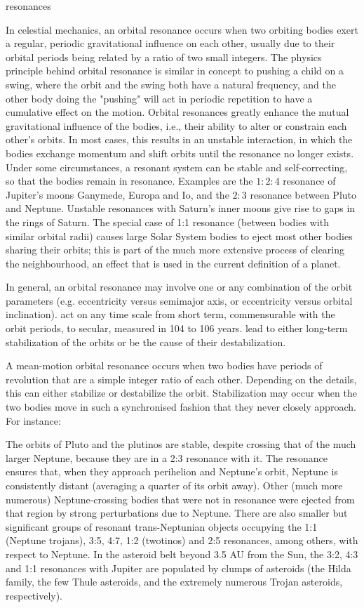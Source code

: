 \begin{frame}[allowframebreaks]{resonances}

In celestial mechanics, an orbital resonance occurs when two orbiting bodies exert a regular, periodic gravitational influence on each other, usually due to their orbital periods being related by a ratio of two small integers. The physics principle behind orbital resonance is similar in concept to pushing a child on a swing, where the orbit and the swing both have a natural frequency, and the other body doing the "pushing" will act in periodic repetition to have a cumulative effect on the motion. Orbital resonances greatly enhance the mutual gravitational influence of the bodies, i.e., their ability to alter or constrain each other's orbits. In most cases, this results in an unstable interaction, in which the bodies exchange momentum and shift orbits until the resonance no longer exists. Under some circumstances, a resonant system can be stable and self-correcting, so that the bodies remain in resonance. Examples are the $1:2:4$ resonance of Jupiter's moons Ganymede, Europa and Io, and the $2:3$ resonance between Pluto and Neptune. Unstable resonances with Saturn's inner moons give rise to gaps in the rings of Saturn. The special case of 1:1 resonance (between bodies with similar orbital radii) causes large Solar System bodies to eject most other bodies sharing their orbits; this is part of the much more extensive process of clearing the neighbourhood, an effect that is used in the current definition of a planet.

In general, an orbital resonance may involve one or any combination of the orbit parameters (e.g. eccentricity versus semimajor axis, or eccentricity versus orbital inclination).
    act on any time scale from short term, commensurable with the orbit periods, to secular, measured in 104 to 106 years.
    lead to either long-term stabilization of the orbits or be the cause of their destabilization.

A mean-motion orbital resonance occurs when two bodies have periods of revolution that are a simple integer ratio of each other. Depending on the details, this can either stabilize or destabilize the orbit. Stabilization may occur when the two bodies move in such a synchronised fashion that they never closely approach. For instance:

    The orbits of Pluto and the plutinos are stable, despite crossing that of the much larger Neptune, because they are in a 2:3 resonance with it. The resonance ensures that, when they approach perihelion and Neptune's orbit, Neptune is consistently distant (averaging a quarter of its orbit away). Other (much more numerous) Neptune-crossing bodies that were not in resonance were ejected from that region by strong perturbations due to Neptune. There are also smaller but significant groups of resonant trans-Neptunian objects occupying the 1:1 (Neptune trojans), 3:5, 4:7, 1:2 (twotinos) and 2:5 resonances, among others, with respect to Neptune.
    In the asteroid belt beyond 3.5 AU from the Sun, the 3:2, 4:3 and 1:1 resonances with Jupiter are populated by clumps of asteroids (the Hilda family, the few Thule asteroids, and the extremely numerous Trojan asteroids, respectively).


\end{frame}
